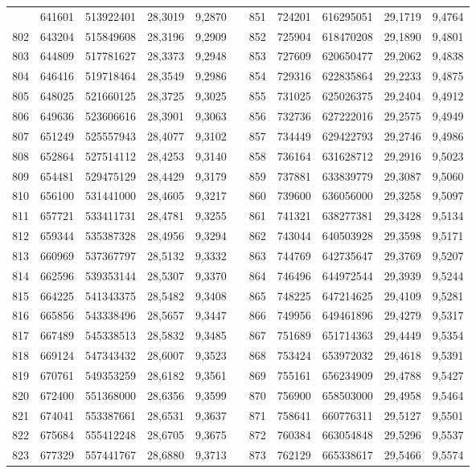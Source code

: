 \begin{longtable}{rrrrrrrrrrr}
\newpage
801&641601&513922401&28,3019&9,2870&&851&724201&616295051&29,1719&9,4764\\
802&643204&515849608&28,3196&9,2909&&852&725904&618470208&29,1890&9,4801\\
803&644809&517781627&28,3373&9,2948&&853&727609&620650477&29,2062&9,4838\\
804&646416&519718464&28,3549&9,2986&&854&729316&622835864&29,2233&9,4875\\
805&648025&521660125&28,3725&9,3025&&855&731025&625026375&29,2404&9,4912\\
806&649636&523606616&28,3901&9,3063&&856&732736&627222016&29,2575&9,4949\\
807&651249&525557943&28,4077&9,3102&&857&734449&629422793&29,2746&9,4986\\
808&652864&527514112&28,4253&9,3140&&858&736164&631628712&29,2916&9,5023\\
809&654481&529475129&28,4429&9,3179&&859&737881&633839779&29,3087&9,5060\\
810&656100&531441000&28,4605&9,3217&&860&739600&636056000&29,3258&9,5097\\
811&657721&533411731&28,4781&9,3255&&861&741321&638277381&29,3428&9,5134\\
812&659344&535387328&28,4956&9,3294&&862&743044&640503928&29,3598&9,5171\\
813&660969&537367797&28,5132&9,3332&&863&744769&642735647&29,3769&9,5207\\
814&662596&539353144&28,5307&9,3370&&864&746496&644972544&29,3939&9,5244\\
815&664225&541343375&28,5482&9,3408&&865&748225&647214625&29,4109&9,5281\\
816&665856&543338496&28,5657&9,3447&&866&749956&649461896&29,4279&9,5317\\
817&667489&545338513&28,5832&9,3485&&867&751689&651714363&29,4449&9,5354\\
818&669124&547343432&28,6007&9,3523&&868&753424&653972032&29,4618&9,5391\\
819&670761&549353259&28,6182&9,3561&&869&755161&656234909&29,4788&9,5427\\
820&672400&551368000&28,6356&9,3599&&870&756900&658503000&29,4958&9,5464\\
821&674041&553387661&28,6531&9,3637&&871&758641&660776311&29,5127&9,5501\\
822&675684&555412248&28,6705&9,3675&&872&760384&663054848&29,5296&9,5537\\
823&677329&557441767&28,6880&9,3713&&873&762129&665338617&29,5466&9,5574\\

\end{longtable}
